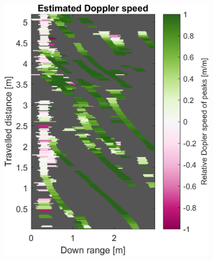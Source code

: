 \begin{figure}[htbp]
\begin{subfigure}[t]{0.475\linewidth}
        \includegraphics[width=\linewidth,max height=.475\textheight]{gfx/results/racetrack_doppler.png}
    \end{subfigure}\bigskip\\
    \begin{subfigure}[t]{0.475\linewidth}  
        \centering 

\end{subfigure}
\end{figure}
